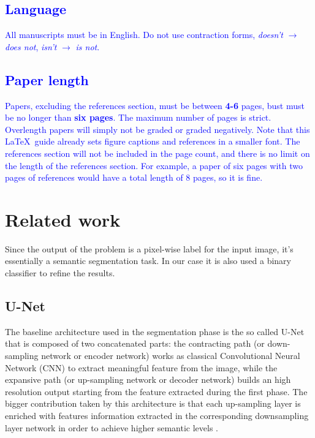 \documentclass[10pt,twocolumn,letterpaper]{article}
\begin{document}
   \textcolor{blue}{
   \subsection{Language}
      All manuscripts must be in English. Do not use contraction forms, \eg \emph{doesn't} $\xrightarrow{}$ \emph{does not}, \emph{isn't} $\xrightarrow{}$ \emph{is not}. }

   \textcolor{blue}{
   \subsection{Paper length}
      Papers, excluding the references section, must be between \textbf{4-6} pages, bust must be no longer than \textbf{six pages}. The maximum number of pages is strict. Overlength papers will simply not be graded or graded negatively. Note that this \LaTeX\ guide already sets figure captions and references in a smaller font.
      The references section will not be included in the page count, and there is no limit on the length of the references section. For example, a paper of six pages with two pages of references would have a total length of 8 pages, so it is fine.}



\section{Related work}
   Since the output of the problem is a pixel-wise label for the input image, it’s essentially a semantic segmentation task. In our case it is also used a binary classifier to refine the results.
   \subsection{U-Net}
      The baseline architecture used in the segmentation phase is the so called U-Net that is composed of two concatenated parts: the contracting path (or down-sampling network or encoder network) works as classical Convolutional Neural Network (CNN) to extract meaningful feature from the image, while the expansive path (or up-sampling network or decoder network) builds an high resolution output starting from the feature extracted during the first phase. The bigger contribution taken by this architecture is that each up-sampling layer is enriched with features information extracted in the corresponding downsampling layer network in order to achieve higher semantic levels \cite{Unet}. 
\end{document}
